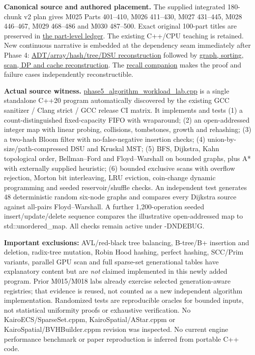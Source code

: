 \textbf{Canonical source and authored placement.} The supplied integrated 180-chunk v2 plan gives M025 Parts 401--410, M026 411--430, M027 431--445, M028 446--467, M029 468--486 and M030 487--500. Exact original 100-part titles are preserved in \hyperref[appendix-fd090d982a15-phase-5-algorithms-and-data-structure-workload-contracts-parts-401500]{the part-level ledger}. The existing C++/CPU teaching is retained. New continuous narrative is embedded at the dependency seam immediately after Phase 4: \hyperref[01-foundations-i-ch007-the-scene-is-now-too-large-for-the-wrong-container-phase-5-m025m027-parts-401445]{ADT/array/hash/tree/DSU reconstruction} followed by \hyperref[01-foundations-i-ch008-from-an-asset-map-to-a-correct-navigable-world-phase-5-m028m030-parts-446500]{graph, sorting, scan, DP and cache reconstruction}. The \hyperref[appendix-8a046b38375e]{recall companion} makes the proof and failure cases independently reconstructible.

\textbf{Actual source witness.} \hyperref[source-file-0ec69e1a1a11439bca29faa5]{phase5\_algorithm\_workload\_lab.cpp} is a single standalone C++20 program automatically discovered by the existing GCC sanitizer / Clang strict / GCC release CI matrix. It implements and tests (1) a count-distinguished fixed-capacity FIFO with wraparound; (2) an open-addressed integer map with linear probing, collisions, tombstones, growth and rehashing; (3) a two-hash Bloom filter with no-false-negative insertion checks; (4) union-by-size/path-compressed DSU and Kruskal MST; (5) BFS, Dijkstra, Kahn topological order, Bellman--Ford and Floyd--Warshall on bounded graphs, plus A* with externally supplied heuristic; (6) bounded exclusive scans with overflow rejection, Morton bit interleaving, LRU eviction, coin-change dynamic programming and seeded reservoir/shuffle checks. An independent test generates 48 deterministic random six-node graphs and compares every Dijkstra source against all-pairs Floyd--Warshall. A further 1,200-operation seeded insert/update/delete sequence compares the illustrative open-addressed map to std::unordered\_map. All checks remain active under -DNDEBUG.

\textbf{Important exclusions:} AVL/red-black tree balancing, B-tree/B+ insertion and deletion, radix-tree mutation, Robin Hood hashing, perfect hashing, SCC/Prim variants, parallel GPU scan and full sparse-set generational tables have explanatory content but are \emph{not} claimed implemented in this newly added program. Prior M015/M018 labs already exercise selected generation-aware registries; that evidence is reused, not counted as a new independent algorithm implementation. Randomized tests are reproducible oracles for bounded inputs, not statistical uniformity proofs or exhaustive verification. No KairoECS/SparseSet.cppm, KairoSpatial/AStar.cppm or KairoSpatial/BVHBuilder.cppm revision was inspected. No current engine performance benchmark or paper reproduction is inferred from portable C++ code.

